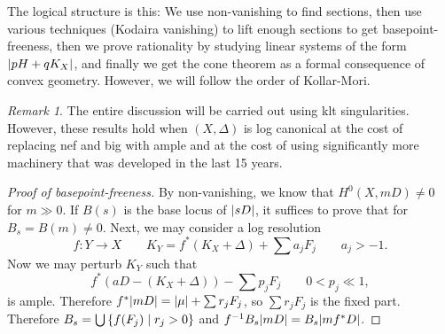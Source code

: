 \documentclass[leqno, openany]{memoir}
\theoremstyle{definition}
\theoremstyle{remark}
\newtheorem{rmk}[thm]{Remark}
\theoremstyle{plain}
\theoremstyle{definition}
\theoremstyle{remark}
\begin{document}
The logical structure is this: We use non-vanishing to find sections, then use various techniques (Kodaira vanishing) to lift enough sections to get basepoint-freeness, then we prove rationality by studying linear systems of the form $\abs{pH + q K_X}$, and finally we get the cone theorem as a formal consequence of convex geometry. However, we will follow the order of Kollar-Mori.

\begin{rmk}
    The entire discussion will be carried out using klt singularities. However, these results hold when $(X, \Delta)$ is log canonical at the cost of replacing nef and big with ample and at the cost of using significantly more machinery that was developed in the last 15 years.
\end{rmk}

\begin{proof}[Proof of basepoint-freeness]
    By non-vanishing, we know that $H^0(X, mD) \neq 0$ for $m \gg 0$. If $B(s)$ is the base locus of $\abs{sD}$, it suffices to prove that for $B_s = B(m) \neq 0$. Next, we may consider a log resolution
    \[ f \colon Y \to X \qquad K_Y = f^* (K_X + \Delta) + \sum a_j F_j \qquad a_j > -1. \]
    Now we may perturb $K_Y$ such that
    \[ f^* (aD - (K_X + \Delta)) - \sum p_j F_j \qquad 0 < p_j \ll 1, \]
    is ample. Therefore $f^* \abs{mD} = \abs{\mu} + \sum r_j F_j$, so $\sum r_j F_j$ is the fixed part. Therefore $B_s = \bigcup \qty{f(F_j) \mid r_j > 0}$ and $f^{-1} B_s \abs{mD} = B_s \abs{mf^* D}$. 


\end{proof}
\end{document}

